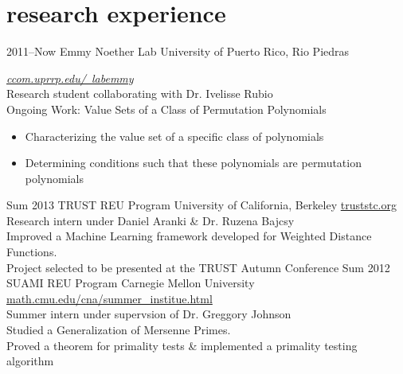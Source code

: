 \documentclass[]{friggeri-cv}
\begin{document}

\section{research experience}

\begin{entrylist}
\entry
{2011--Now}
{Emmy Noether Lab}
{University of Puerto Rico, Rio Piedras}
{\emph{\href{http://ccom.uprrp.edu/~labemmy}{ccom.uprrp.edu/~labemmy}} \\
Research student collaborating with Dr. Ivelisse Rubio \\
Ongoing Work: Value Sets of a Class of Permutation Polynomials
\begin{itemize}
\item Characterizing the value set of a specific class of polynomials
\item Determining conditions such that these polynomials are permutation polynomials
\end{itemize}}
\entry
{Sum 2013}
{TRUST REU Program}
{University of California, Berkeley}
{\href{https://www.truststc.org/education/reu/13/index.html}{truststc.org} \\
Research intern under Daniel Aranki \& Dr. Ruzena Bajcsy \\
Improved a Machine Learning framework developed for Weighted Distance Functions. \\
Project selected to be presented at the TRUST Autumn Conference}
\entry
{Sum 2012}
{SUAMI REU Program}
{Carnegie Mellon University}
{\href{http://www.math.cmu.edu/cna/summer_institute.html}{math.cmu.edu/cna/summer\_institue.html} \\
Summer intern under supervsion of Dr. Greggory Johnson\\
Studied a Generalization of Mersenne Primes. \\
Proved a theorem for primality tests \& implemented a primality testing algorithm}
\end{entrylist}

\end{document}
